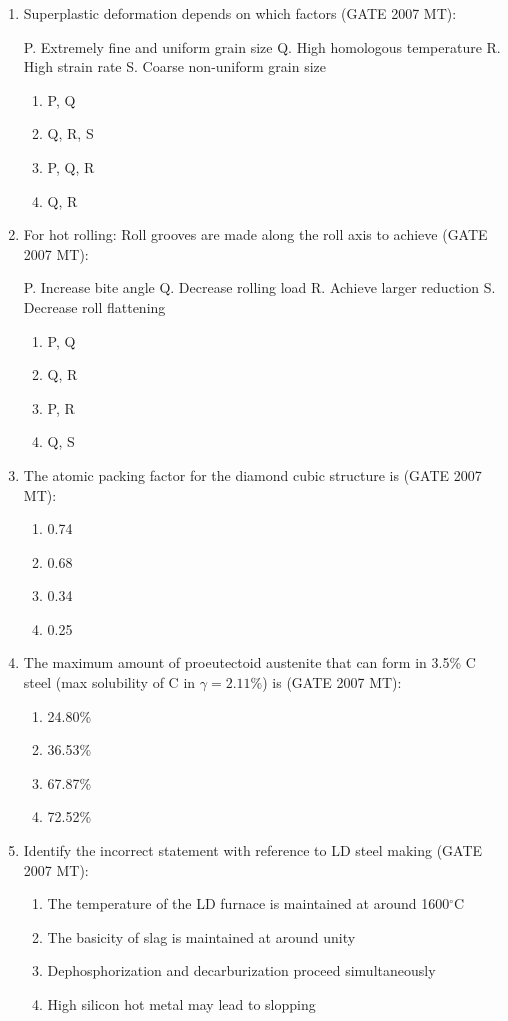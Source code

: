 \documentclass[12pt]{article}
\begin{document}
\begin{enumerate}
\item Superplastic deformation depends on which factors (GATE 2007 MT):

P. Extremely fine and uniform grain size  
Q. High homologous temperature  
R. High strain rate  
S. Coarse non-uniform grain size

\begin{enumerate}
  \item P, Q
  \item Q, R, S
  \item P, Q, R
  \item Q, R
\end{enumerate}

\item For hot rolling: Roll grooves are made along the roll axis to achieve (GATE 2007 MT):

P. Increase bite angle  
Q. Decrease rolling load  
R. Achieve larger reduction  
S. Decrease roll flattening

\begin{enumerate}
  \item P, Q
  \item Q, R
  \item P, R
  \item Q, S
\end{enumerate}
\setcounter{enumi}{40} %

\item The atomic packing factor for the diamond cubic structure is (GATE 2007 MT):
  \begin{enumerate}[label=(\Alph*)]
    \item 0.74
    \item 0.68
    \item 0.34
    \item 0.25
  \end{enumerate}

\item The maximum amount of proeutectoid austenite that can form in 3.5\% C steel (max solubility of C in $\gamma = 2.11$\%) is (GATE 2007 MT):
  \begin{enumerate}[label=(\Alph*)]
    \item 24.80\%
    \item 36.53\%
    \item 67.87\%
    \item 72.52\%
  \end{enumerate}

\item Identify the incorrect statement with reference to LD steel making (GATE 2007 MT):
  \begin{enumerate}[label=(\Alph*)]
    \item The temperature of the LD furnace is maintained at around 1600$^\circ$C
    \item The basicity of slag is maintained at around unity
    \item Dephosphorization and decarburization proceed simultaneously
    \item High silicon hot metal may lead to slopping
  \end{enumerate}


\end{enumerate}
\end{document}
